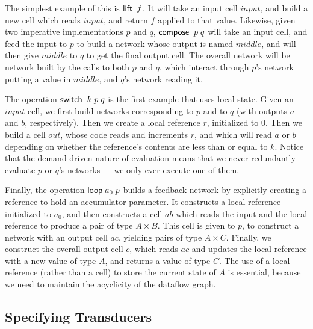 The simplest example of this is $\mathsf{lift}\;\;f$. It will take an input
cell $input$, and build a new cell which reads $input$, and return $f$
applied to that value. Likewise, given two imperative implementations $p$
and $q$, $\mathsf{compose}\;\;p\;q$ will take an input cell, and feed the
input to $p$ to build a network whose output is named $middle$, and
will then give $middle$ to $q$ to get the final output cell. The
overall network will be network built by the calls to both $p$ and
$q$, which interact through $p$'s network putting a value in $middle$,
and $q$'s network reading it.

The operation $\mathsf{switch}\;\;k\;p\;q$ is the first example that uses 
local state. Given an $input$ cell, we first build networks corresponding
to $p$ and to $q$ (with outputs $a$ and $b$, respectively). Then we
create a local reference $r$, initialized to $0$. Then we build a cell $out$,
whose code reads and increments $r$, and which will read $a$ or $b$ depending
on whether the reference's contents are less than or equal to $k$. Notice
that the demand-driven nature of evaluation means that we never redundantly
evaluate $p$ or $q$'s networks --- we only ever execute one of them. 

Finally, the operation $\mathsf{loop}\; a_0\;p$ builds a feedback network by
explicitly creating a reference to hold an accumulator parameter. It
constructs a local reference initialized to $a_0$, and then constructs
a cell $ab$ which reads the input and the local reference to produce a
pair of type $A \times B$. This cell is given to $p$, to construct a
network with an output cell $ac$, yielding pairs of type $A \times
C$. Finally, we construct the overall output cell $c$, which reads
$ac$ and updates the local reference with a new value of type $A$, and
returns a value of type $C$. The use of a local reference (rather than
a cell) to store the current state of $A$ is essential, because we need
to maintain the acyclicity of the dataflow graph. 

\subsection{Specifying Transducers}

